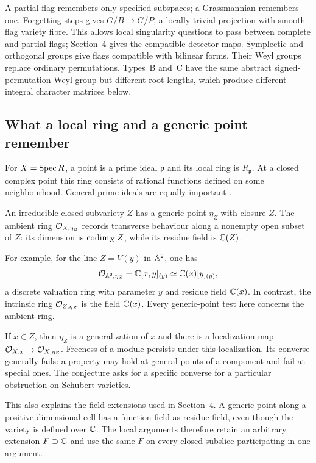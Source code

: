 A partial flag remembers only specified subspaces; a Grassmannian remembers one. Forgetting steps gives $G/B\to G/P$, a locally trivial projection with smooth flag variety fibre. This allows local singularity questions to pass between complete and partial flags; Section~4 gives the compatible detector maps. Symplectic and orthogonal groups give flags compatible with bilinear forms. Their Weyl groups replace ordinary permutations. Types~B and~C have the same abstract signed-permutation Weyl group but different root lengths, which produce different integral character matrices below.

\subsection{What a local ring and a generic point remember}
For $X=\operatorname{Spec} R$, a point is a prime ideal $\mathfrak p$ and its local ring is $R_{\mathfrak p}$. At a closed complex point this ring consists of rational functions defined on some neighbourhood. General prime ideals are equally important \cite[Chapter~II, Sections~2--3]{Har77}.

An irreducible closed subvariety $Z$ has a generic point $\eta_Z$ with closure $Z$. The ambient ring $\mathcal O_{X,\eta_Z}$ records transverse behaviour along a nonempty open subset of $Z$: its dimension is $\operatorname{codim}_X Z$, while its residue field is $\mathbb C(Z)$.

For example, for the line $Z=V(y)$ in $\mathbb A^2$, one has
\[
 \mathcal O_{\mathbb A^2,\eta_Z}=\mathbb C[x,y]_{(y)}\simeq\mathbb C(x)[y]_{(y)},
\]
a discrete valuation ring with parameter $y$ and residue field $\mathbb C(x)$. In contrast, the intrinsic ring $\mathcal O_{Z,\eta_Z}$ is the field $\mathbb C(x)$. Every generic-point test here concerns the ambient ring.

If $x\in Z$, then $\eta_Z$ is a generalization of $x$ and there is a localization map $\mathcal O_{X,x}\to\mathcal O_{X,\eta_Z}$. Freeness of a module persists under this localization. Its converse generally fails: a property may hold at general points of a component and fail at special ones. The conjecture asks for a specific converse for a particular obstruction on Schubert varieties.

This also explains the field extensions used in Section~4. A generic point along a positive-dimensional cell has a function field as residue field, even though the variety is defined over $\mathbb C$. The local arguments therefore retain an arbitrary extension $F\supset\mathbb C$ and use the same $F$ on every closed subslice participating in one argument.

